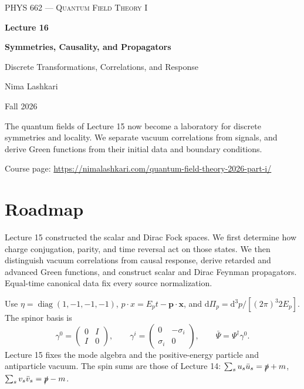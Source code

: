 \documentclass[11pt]{article}
\newcommand{\dd}{\mathrm{d}}
\newcommand{\diag}{\operatorname{diag}}
\begin{document}
\begin{titlepage}
\centering
\vspace*{1.2in}
{\scshape\Large PHYS 662 --- Quantum Field Theory I\par}
\vspace{0.35in}
{\Huge\bfseries\color{qftblue} Lecture 16\par}
\vspace{0.18in}
{\LARGE\bfseries Symmetries, Causality, and Propagators\par}
\vspace{0.16in}
{\large\color{qftgreen} Discrete Transformations, Correlations, and Response\par}
\vspace{0.6in}
{\large Nima Lashkari\par}
{\large Fall 2026\par}
\vfill
\begin{minipage}{0.86\textwidth}\small
The quantum fields of Lecture 15 now become a laboratory for discrete symmetries and locality. We separate vacuum correlations from signals, and derive Green functions from their initial data and boundary conditions.

\medskip
Course page: \url{https://nimalashkari.com/quantum-field-theory-2026-part-i/}
\end{minipage}
\vspace{0.5in}
\end{titlepage}
\setcounter{tocdepth}{1}\begingroup\small\tableofcontents\endgroup
\newpage
{}

\section*{Roadmap}
Lecture 15 constructed the scalar and Dirac Fock spaces. We first determine
how charge conjugation, parity, and time reversal act on those states.
We then distinguish vacuum correlations from causal response, derive
retarded and advanced Green functions, and construct scalar and Dirac
Feynman propagators. Equal-time canonical data fix every source normalization.

\begin{keyidea}
Use \(\eta=\diag(1,-1,-1,-1)\), \(p\cdot x=E_pt-\bm p\cdot\bm x\),
and \(\dd\Pi_p=\dd^3p/[(2\pi)^3 2E_p]\). The spinor basis is
\[
\gamma^0=\begin{pmatrix}0&I\\I&0\end{pmatrix},\qquad
\gamma^i=\begin{pmatrix}0&-\sigma_i\\\sigma_i&0\end{pmatrix},\qquad
\bar\Psi=\Psi^\dagger\gamma^0.
\]
Lecture 15 fixes the mode algebra and the positive-energy particle and
antiparticle vacuum. The spin sums are those of Lecture 14:
\(\sum_su_s\bar u_s=\slashed p+m\),
\(\sum_sv_s\bar v_s=\slashed p-m\).
\end{keyidea}
\end{document}
